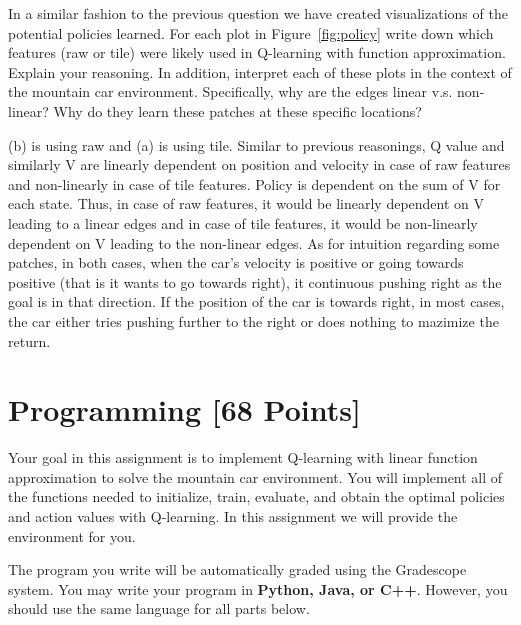 \documentclass[11pt,addpoints,answers]{exam}
\begin{document}
\begin{questions}
    \question[2] In a similar fashion to the previous question we have created visualizations of the potential policies learned. For each plot in Figure~\ref{fig:policy} write down which features (raw or tile) were likely used in Q-learning with function approximation. Explain your reasoning. In addition, interpret each of these plots in the context of the mountain car environment. Specifically, why are the edges linear v.s. non-linear? Why do they learn these patches at these specific locations? 
        
    \begin{your_solution}[title=Answer,height=5cm,width=15cm]
        \vspace{-5pt}
        (b) is using raw and (a) is using tile. Similar to previous reasonings, Q value and similarly V are linearly dependent on position and velocity in case of raw features and non-linearly in case of tile features.
        Policy is dependent on the sum of V for each state. Thus, in case of raw features, it would be linearly dependent on V leading to a linear edges and in case of tile features, it would be non-linearly dependent on V leading to the non-linear edges. As for intuition regarding some patches, in both cases, when the car's velocity is positive or going towards positive (that is it wants to go towards right), it continuous pushing right as the goal is in that direction. If the position of the car is towards right, in most cases, the car either tries pushing further to the right or does nothing to mazimize the return.
    \end{your_solution}
\end{questions}

    \clearpage
    \clearpage
\section{Programming [68 Points]}
\label{sec:code}

Your goal in this assignment is to implement Q-learning with linear function approximation to solve the mountain car environment. You will implement all of the functions needed to initialize, train, evaluate, and obtain the optimal policies and action values with Q-learning. In this assignment we will provide the environment for you.

The program you write will be automatically graded using the Gradescope system. You may write your program in \textbf{Python, Java, or C++}. However, you should use the same language for all parts below.
\end{document}
